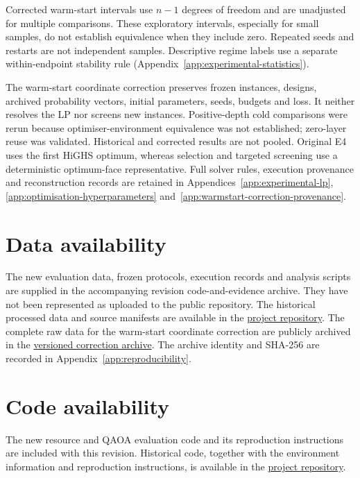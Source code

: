 \documentclass[a4paper,onecolumn,11pt,unpublished]{quantumarticle}
\theoremstyle{remark}
\begin{document}
Corrected warm-start intervals use $n-1$ degrees of freedom and are
unadjusted for multiple comparisons. These exploratory intervals, especially
for small samples, do not establish equivalence when they include zero.
Repeated seeds and restarts are not independent samples. Descriptive regime
labels use a separate within-endpoint stability rule
(Appendix~\ref{app:experimental-statistics}).

The warm-start coordinate correction preserves frozen instances, designs,
archived probability vectors, initial parameters, seeds, budgets and loss.
It neither resolves the LP nor screens new instances. Positive-depth cold
comparisons were rerun because optimiser-environment equivalence was not
established; zero-layer reuse was validated. Historical and corrected results
are not pooled. Original E4 uses the first HiGHS optimum, whereas selection
and targeted screening use a deterministic optimum-face representative.
Full solver rules, execution provenance and reconstruction records are
retained in Appendices~\ref{app:experimental-lp},
\ref{app:optimisation-hyperparameters}
and~\ref{app:warmstart-correction-provenance}.

\FloatBarrier
\section*{Data availability}
The new evaluation data, frozen protocols, execution records and analysis scripts
are supplied in the accompanying revision code-and-evidence archive. They have
not been represented as uploaded to the public repository. The historical
processed data and source manifests
are available in the
\href{https://github.com/rrocy6/urss-selective-locality-reduction}{project
repository}. The complete raw data for the warm-start coordinate correction are publicly
archived in the
\href{https://github.com/rrocy6/urss-selective-locality-reduction/blob/efaa1ce60fbc9984006472c4b2672578027fac78/delivery/20260913/archives/URSS_WARMSTART_CORRECTION_EXECUTED_v1.zip}{versioned correction archive}.
The archive identity and SHA-256 are recorded in
Appendix~\ref{app:reproducibility}. 

\section*{Code availability}
The new resource and QAOA evaluation code and its reproduction instructions
are included with this revision. Historical code, together with the
environment information and reproduction instructions, is available in the
\href{https://github.com/rrocy6/urss-selective-locality-reduction}{project
repository}.
\end{document}
